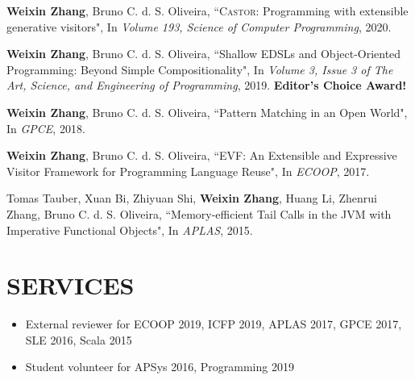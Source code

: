 \documentclass[paper=letter,fontsize=11pt]{scrartcl} %
\newcommand{\NewPart}[2]{\section*{\uppercase{#1} #2}}
\newcommand{\PaperEntry}[4]{
		\noindent #1, ``{#2}", In \textit{#3}, #4.} %
\newcommand{\ArxivEntry}[3]{
		\noindent #1, ``\href{http://arxiv.org/abs/#3}{#2}", \textit{{cond-mat/}#3}.}
\begin{document}
\begin{etaremune}

\item \PaperEntry{\textbf{Weixin Zhang}, Bruno C. d. S.
    Oliveira}{\textsc{Castor}: Programming with extensible generative
    visitors}{Volume 193, Science of Computer Programming}{2020} 

\item \PaperEntry{\textbf{Weixin Zhang}, Bruno C. d. S. Oliveira}{Shallow EDSLs
    and Object-Oriented Programming: Beyond Simple Compositionality}{Volume 3,
    Issue 3 of The Art,
    Science, and Engineering of Programming}{2019}{ \textbf{Editor's Choice Award!}}

\item \PaperEntry{\textbf{Weixin Zhang}, Bruno C. d. S. Oliveira}{Pattern
    Matching in an Open World}{GPCE}{2018}

\item \PaperEntry{\textbf{Weixin Zhang}, Bruno C. d. S. Oliveira}{EVF: An Extensible and
    Expressive Visitor Framework for Programming Language Reuse}{ECOOP}{2017}

\item \PaperEntry{Tomas Tauber, Xuan Bi, Zhiyuan Shi, \textbf{Weixin Zhang}, Huang Li, Zhenrui Zhang, Bruno C. d. S. Oliveira}{Memory-efficient Tail Calls in the JVM with Imperative Functional Objects}{APLAS}{2015}
\end{etaremune}




\NewPart{Services}{}
\begin{itemize}
\item External reviewer for ECOOP 2019, ICFP 2019, APLAS 2017, GPCE 2017, SLE
  2016, Scala 2015
\item Student volunteer for APSys 2016, Programming 2019
\end{itemize}
\end{document}
